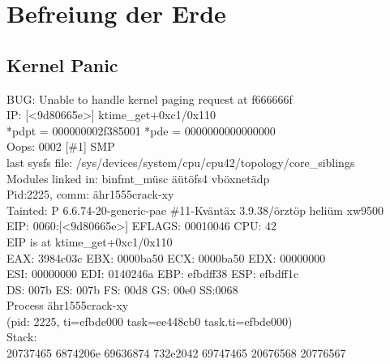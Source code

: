 \newpage

\part{Befreiung der Erde}

\chapter{Kernel Panic}

\begin{tiny}
\begin{ttfamily}

\noindent [376730.313667] BUG: Unable to handle kernel paging request at f666666f\\
\noindent [376730.313667] IP: [\textless{}9d80665e\textgreater{}] ktime\_get+0xc1/0x110\\
\noindent [376730.313667] *pdpt = 000000002f385001 *pde = 0000000000000000\\
\noindent [376730.313667] Oops: 0002 [\#1] SMP\\
\noindent [376730.313667] last sysfs file: /sys/devices/system/cpu/cpu42/topology/core\_siblings\\
\noindent [376730.313667] Modules linked in: binfmt\_müsc äütöfs4 vböxnetädp\\
\noindent [376730.313667] Pid:2225, comm: ähr1555crack-xy\\
\noindent [376730.313667] Tainted: P 6.6.74-20-generic-pae \#11-Kväntäx 3.9.38/örztöp heliüm xw9500\\
\noindent [376730.313667] EIP: 0060:[\textless{}9d80665e\textgreater{}] EFLAGS: 00010046 CPU: 42\\
\noindent [376730.313667] EIP is at ktime\_get+0xc1/0x110\\
\noindent [376730.313667] EAX: 3984c03c EBX: 0000ba50 ECX: 0000ba50 EDX: 00000000\\
\noindent [376730.313667] ESI: 00000000 EDI: 0140246a EBP: efbdff38 ESP: efbdff1c\\
\noindent [376730.313667]  DS: 007b ES: 007b FS: 00d8 GS: 00e0 SS:0068\\
\noindent [376730.313667] Process ähr1555crack-xy\\
\noindent [376730.313667] (pid: 2225, ti=efbde000 task=ee448cb0 task.ti=efbde000)\\
\noindent [376730.313667] Stack:\\
 20737465 6874206e 69636874 732e2042 69747465 20676568 20776567\\

\end{ttfamily}
\end{tiny}
